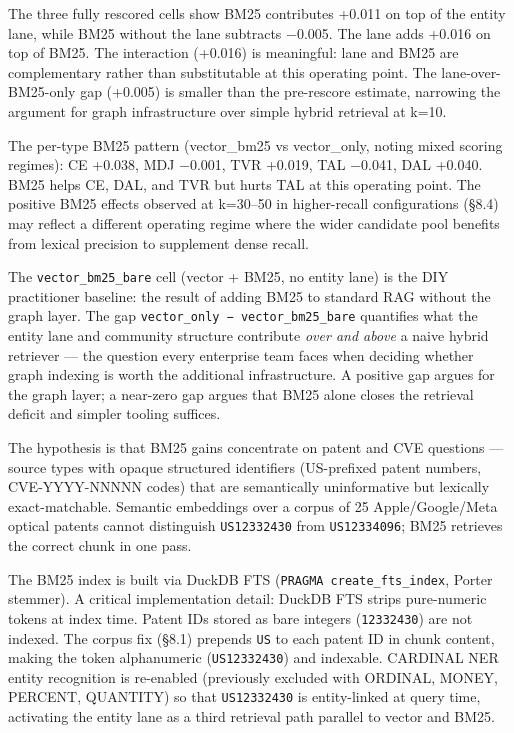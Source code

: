 The three fully rescored cells show BM25 contributes +0.011 on top of the entity lane, while BM25 without the lane subtracts −0.005. The lane adds +0.016 on top of BM25. The interaction (+0.016) is meaningful: lane and BM25 are complementary rather than substitutable at this operating point. The lane-over-BM25-only gap (+0.005) is smaller than the pre-rescore estimate, narrowing the argument for graph infrastructure over simple hybrid retrieval at k=10.

The per-type BM25 pattern (vector\_bm25 vs vector\_only, noting mixed scoring regimes): CE +0.038, MDJ −0.001, TVR +0.019, TAL −0.041, DAL +0.040. BM25 helps CE, DAL, and TVR but hurts TAL at this operating point. The positive BM25 effects observed at k=30--50 in higher-recall configurations (§8.4) may reflect a different operating regime where the wider candidate pool benefits from lexical precision to supplement dense recall.

The \texttt{vector\_bm25\_bare} cell (vector + BM25, no entity lane) is the DIY practitioner baseline: the result of adding BM25 to standard RAG without the graph layer. The gap \texttt{vector\_only\ −\ vector\_bm25\_bare} quantifies what the entity lane and community structure contribute \emph{over and above} a naive hybrid retriever --- the question every enterprise team faces when deciding whether graph indexing is worth the additional infrastructure. A positive gap argues for the graph layer; a near-zero gap argues that BM25 alone closes the retrieval deficit and simpler tooling suffices.

The hypothesis is that BM25 gains concentrate on patent and CVE questions --- source types with opaque structured identifiers (US-prefixed patent numbers, CVE-YYYY-NNNNN codes) that are semantically uninformative but lexically exact-matchable. Semantic embeddings over a corpus of 25 Apple/Google/Meta optical patents cannot distinguish \texttt{US12332430} from \texttt{US12334096}; BM25 retrieves the correct chunk in one pass.

The BM25 index is built via DuckDB FTS (\texttt{PRAGMA\ create\_fts\_index}, Porter stemmer). A critical implementation detail: DuckDB FTS strips pure-numeric tokens at index time. Patent IDs stored as bare integers (\texttt{12332430}) are not indexed. The corpus fix (§8.1) prepends \texttt{US} to each patent ID in chunk content, making the token alphanumeric (\texttt{US12332430}) and indexable. CARDINAL NER entity recognition is re-enabled (previously excluded with ORDINAL, MONEY, PERCENT, QUANTITY) so that \texttt{US12332430} is entity-linked at query time, activating the entity lane as a third retrieval path parallel to vector and BM25.

